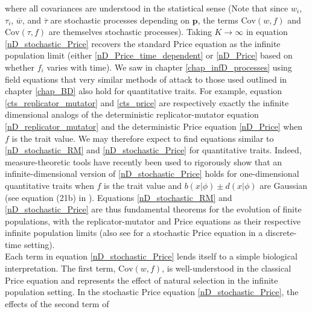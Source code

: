 where all covariances are understood in the statistical sense (Note that since $w_i$, $\tau_i$, $\overline{w}$, and $\overline{\tau}$ are stochastic processes depending on $\mathbf{p}$, the terms $\textrm{Cov}(w,f)$ and $\textrm{Cov}(\tau,f)$ are themselves stochastic processes). Taking $K \to \infty$ in equation \eqref{nD_stochastic_Price} recovers the standard Price equation as the infinite population limit (either \eqref{nD_Price_time_dependent} or \eqref{nD_Price} based on whether $f_i$ varies with time). We saw in chapter \ref{chap_infD_processes} using field equations that very similar methods of attack to those used outlined in chapter \eqref{chap_BD} also hold for quantitative traits. For example, equation \eqref{cts_replicator_mutator} and \eqref{cts_price} are respectively exactly the infinite dimensional analogs of the deterministic replicator-mutator equation \eqref{nD_replicator_mutator} and the deterministic Price equation \eqref{nD_Price} when $f$ is the trait value. We may therefore expect to find equations similar to \eqref{nD_stochastic_RM} and \eqref{nD_stochastic_Price} for quantitative traits. Indeed, measure-theoretic tools have recently been used to rigorously show that an infinite-dimensional version of \eqref{nD_stochastic_Price} holds for one-dimensional quantitative traits when $f$ is the trait value and $b(x|\phi) \pm d(x|\phi)$ are Gaussian (see equation (21b) in \cite{week_white_2021}). Equations \eqref{nD_stochastic_RM} and \eqref{nD_stochastic_Price} are thus fundamental theorems for the evolution of finite populations, with the replicator-mutator and Price equations as their respective infinite population limits (also see \citep{rice_universal_2020} for a stochastic Price equation in a discrete-time setting).\\
Each term in equation \eqref{nD_stochastic_Price} lends itself to a simple biological interpretation. The first term, $\textrm{Cov}(w,f)$, is well-understood in the classical Price equation and represents the effect of natural selection in the infinite population setting. In the stochastic Price equation \eqref{nD_stochastic_Price}, the effects of the second term of 
